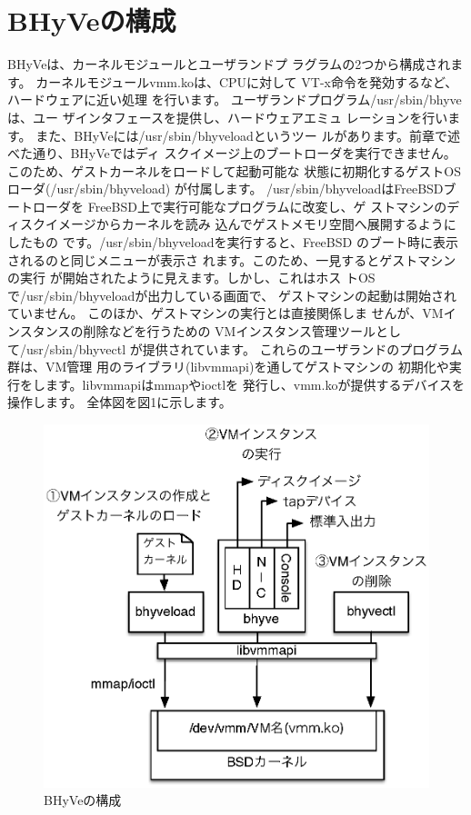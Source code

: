 \section{BHyVeの構成}

 BHyVeは、カーネルモジュールとユーザランドプ
ラグラムの2つから構成されます。
 カーネルモジュールvmm.koは、CPUに対して
VT-x命令を発効するなど、ハードウェアに近い処理
を行います。
 ユーザランドプログラム/usr/sbin/bhyveは、ユー
ザインタフェースを提供し、ハードウェアエミュ
レーションを行います。
 また、BHyVeには/usr/sbin/bhyveloadというツー
ルがあります。前章で述べた通り、BHyVeではディ
スクイメージ上のブートローダを実行できません。
このため、ゲストカーネルをロードして起動可能な
状態に初期化するゲストOSローダ(/usr/sbin/bhyveload)
が付属します。
 /usr/sbin/bhyveloadはFreeBSDブートローダを
FreeBSD上で実行可能なプログラムに改変し、ゲ
ストマシンのディスクイメージからカーネルを読み
込んでゲストメモリ空間へ展開するようにしたもの
です。/usr/sbin/bhyveloadを実行すると、FreeBSD
のブート時に表示されるのと同じメニューが表示さ
れます。このため、一見するとゲストマシンの実行
が開始されたように見えます。しかし、これはホス
トOSで/usr/sbin/bhyveloadが出力している画面で、
ゲストマシンの起動は開始されていません。
 このほか、ゲストマシンの実行とは直接関係しま
せんが、VMインスタンスの削除などを行うための
VMインスタンス管理ツールとして/usr/sbin/bhyvectl
が提供されています。
 これらのユーザランドのプログラム群は、VM管理
用のライブラリ(libvmmapi)を通してゲストマシンの
初期化や実行をします。libvmmapiはmmapやioctlを
発行し、vmm.koが提供するデバイスを操作します。
 全体図を図1に示します。

\begin{figure}
 \includegraphics{figures/part6_fig1.eps}
 \caption{BHyVeの構成}
 \label{fig1}
\end{figure}

